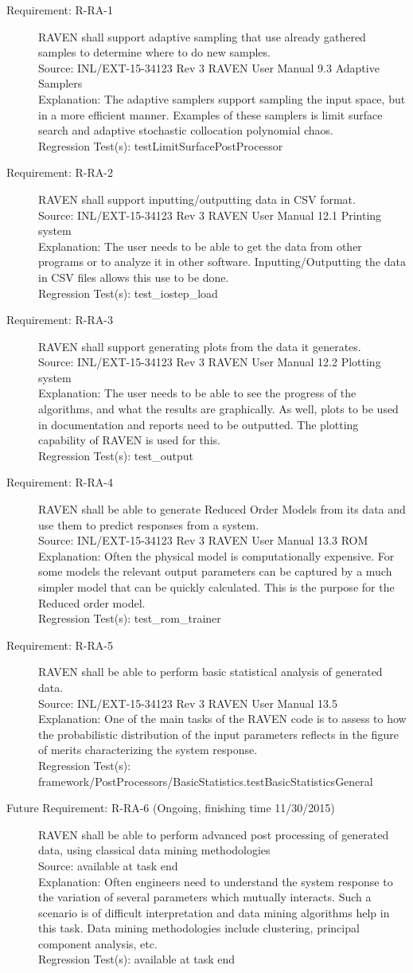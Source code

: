 \documentclass{article}
\newcommand{\requirement}[5]{\item[Requirement: #1] #2 \\Source: #3\\Explanation: #4\\Regression Test(s): #5}
\newcommand{\futurerequirement}[6]{\item[Future Requirement: #1 #6] #2 \\Source: #3\\Explanation: #4\\Regression Test(s): #5}
\begin{document}
\begin{description}

\requirement{R-RA-1}{RAVEN shall support adaptive sampling that use already gathered samples to determine where to do new samples.}
{INL/EXT-15-34123 Rev 3 RAVEN User Manual 9.3 Adaptive Samplers}
{The adaptive samplers support sampling the input space, but in a more efficient manner.  Examples of these samplers is limit surface search and adaptive stochastic collocation polynomial chaos.}
{testLimitSurfacePostProcessor}

\requirement{R-RA-2}{RAVEN shall support inputting/outputting data in CSV format.}
{INL/EXT-15-34123 Rev 3 RAVEN User Manual 12.1 Printing system}
{The user needs to be able to get the data from other programs or to analyze it in other software.  Inputting/Outputting the data in CSV files allows this use to be done.}
{test\_iostep\_load}

\requirement{R-RA-3}{RAVEN shall support generating plots from the data it generates.}
{INL/EXT-15-34123 Rev 3 RAVEN User Manual 12.2 Plotting system}
{The user needs to be able to see the progress of the algorithms, and what the results are graphically.  As well, plots to be used in documentation and reports need to be outputted.  The plotting capability of RAVEN is used for this.}
{test\_output}

\requirement{R-RA-4}{RAVEN shall be able to generate Reduced Order Models from its data and use them to predict responses from a system.}
{INL/EXT-15-34123 Rev 3 RAVEN User Manual 13.3 ROM}
{Often the physical model is computationally expensive.  For some models the relevant output parameters can be captured by a much simpler model that can be quickly calculated.  This is the purpose for the Reduced order model.}
{test\_rom\_trainer}

\requirement{R-RA-5}{RAVEN shall be able to perform basic statistical analysis of generated data.}
{INL/EXT-15-34123 Rev 3 RAVEN User Manual 13.5}
{One of the main tasks of the RAVEN code is to assess to how the probabilistic distribution of the input parameters reflects in the figure of merits characterizing the system response.}
{framework/PostProcessors/BasicStatistics.testBasicStatisticsGeneral}

\futurerequirement{R-RA-6}{RAVEN shall be able to perform advanced post processing of generated data, using classical data mining methodologies}
{available at task end}
{Often engineers need to understand the system response to the variation of several parameters which mutually interacts. Such a scenario is of difficult interpretation and data mining algorithms help in this task.  Data mining methodologies include clustering, principal component analysis, etc.}
{available at task end}
{(Ongoing, finishing time 11/30/2015)}


\end{description}
\end{document}
